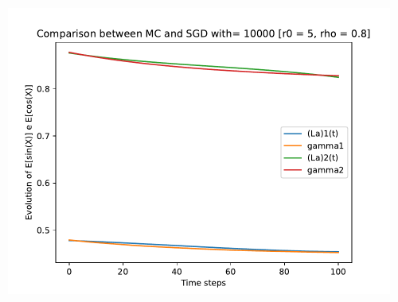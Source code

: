 \documentclass[a4paper,11pt,openright]{report}
\begin{document}
\begin{figure}[H]
\centering
\includegraphics[width=0.9\textwidth]{images/graphs T = 1/n = 3, M = 10000 sine and cosine.pdf}
\end{figure}
\newpage
\end{document}
